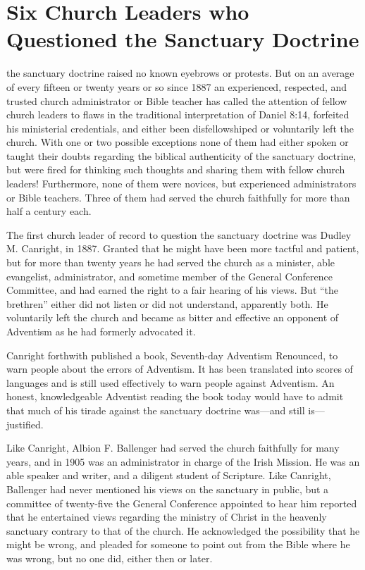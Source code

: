 \chapter{Six Church Leaders who Questioned the Sanctuary Doctrine}
\label{ch:six}

 the sanctuary doctrine raised no known eyebrows or
protests. But on an average of every fifteen or twenty years or so since
1887 an experienced, respected, and trusted church administrator or Bible
teacher has called the attention of fellow church leaders to flaws in the
traditional interpretation of Daniel 8:14, forfeited his ministerial
credentials, and either been disfellowshiped or voluntarily left the church.
With one or two possible exceptions none of them had either spoken or taught
their doubts regarding the biblical authenticity of the sanctuary doctrine,
but were fired for thinking such thoughts and sharing them with fellow
church leaders! Furthermore, none of them were novices, but experienced
administrators or Bible teachers. Three of them had served the church
faithfully for more than half a century each.

The first church leader of record to question the sanctuary doctrine was
Dudley M. Canright, in 1887. Granted that he might have been more tactful
and patient, but for more than twenty years he had served the church as a
minister, able evangelist, administrator, and sometime member of the General
Conference Committee, and had earned the right to a fair hearing of his
views. But ``the brethren'' either did not listen or did not understand,
apparently both. He voluntarily left the church and became as bitter and
effective an opponent of Adventism as he had formerly advocated it.

Canright forthwith published a book, Seventh-day Adventism Renounced, to
warn people about the errors of Adventism. It has been translated into
scores of languages and is still used effectively to warn people against
Adventism. An honest, knowledgeable Adventist reading the book today would
have to admit that much of his tirade against the sanctuary doctrine
was---and still is---justified.

Like Canright, Albion F. Ballenger had served the church faithfully for many
years, and in 1905 was an administrator in charge of the Irish Mission. He
was an able speaker and writer, and a diligent student of Scripture. Like 
Canright, Ballenger had never mentioned his views on the sanctuary in
public, but a committee of twenty-five the General Conference appointed to
hear him reported that he entertained views regarding the ministry of Christ
in the heavenly sanctuary contrary to that of the church. He acknowledged
the possibility that he might be wrong, and pleaded for someone to point out
from the Bible where he was wrong, but no one did, either then or later.

